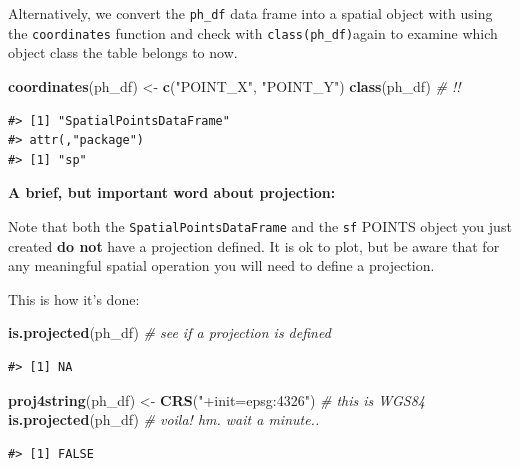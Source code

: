 \documentclass[]{book}
\newenvironment{Shaded}{\begin{snugshade}}{\end{snugshade}}
\newcommand{\KeywordTok}[1]{\textcolor[rgb]{0.13,0.29,0.53}{\textbf{#1}}}
\newcommand{\StringTok}[1]{\textcolor[rgb]{0.31,0.60,0.02}{#1}}
\newcommand{\CommentTok}[1]{\textcolor[rgb]{0.56,0.35,0.01}{\textit{#1}}}
\newcommand{\NormalTok}[1]{#1}
\theoremstyle{definition}
\theoremstyle{definition}
\theoremstyle{definition}
\theoremstyle{remark}
\begin{document}
Alternatively, we convert the \texttt{ph\_df} data frame into a spatial
object with using the \texttt{coordinates} function and check with
\texttt{class(ph\_df)}again to examine which object class the table
belongs to now.

\begin{Shaded}
\begin{Highlighting}[]
\KeywordTok{coordinates}\NormalTok{(ph_df) <-}\StringTok{ }\KeywordTok{c}\NormalTok{(}\StringTok{"POINT_X"}\NormalTok{, }\StringTok{"POINT_Y"}\NormalTok{)}
\KeywordTok{class}\NormalTok{(ph_df) }\CommentTok{# !!}
\end{Highlighting}
\end{Shaded}

\begin{verbatim}
#> [1] "SpatialPointsDataFrame"
#> attr(,"package")
#> [1] "sp"
\end{verbatim}

\textbf{A brief, but important word about projection:}

Note that both the \texttt{SpatialPointsDataFrame} and the \texttt{sf}
POINTS object you just created \textbf{do not} have a projection
defined. It is ok to plot, but be aware that for any meaningful spatial
operation you will need to define a projection.

This is how it's done:

\begin{Shaded}
\begin{Highlighting}[]
\KeywordTok{is.projected}\NormalTok{(ph_df) }\CommentTok{# see if a projection is defined  }
\end{Highlighting}
\end{Shaded}

\begin{verbatim}
#> [1] NA
\end{verbatim}

\begin{Shaded}
\begin{Highlighting}[]
\KeywordTok{proj4string}\NormalTok{(ph_df) <-}\StringTok{ }\KeywordTok{CRS}\NormalTok{(}\StringTok{"+init=epsg:4326"}\NormalTok{) }\CommentTok{# this is WGS84}
\KeywordTok{is.projected}\NormalTok{(ph_df) }\CommentTok{# voila! hm. wait a minute..}
\end{Highlighting}
\end{Shaded}

\begin{verbatim}
#> [1] FALSE
\end{verbatim}
\end{document}
